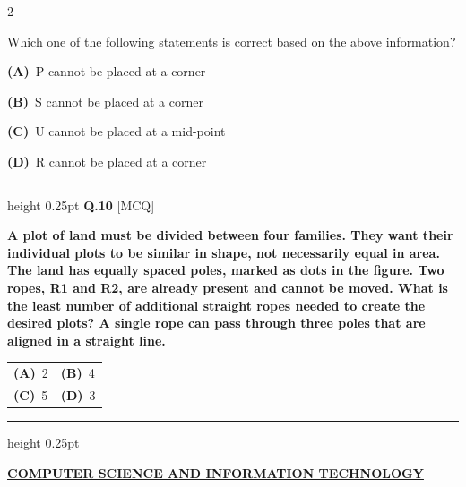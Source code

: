 \documentclass[a4paper,10pt,twoside]{article}
\begin{document}
\begin{multicols}{2}
{Which one of the following statements is correct based on the above information? \par}
\par\vspace{2pt}\noindent
\textbf{(A)}~P cannot be placed at a corner\par\vspace{2pt}\noindent
\textbf{(B)}~S cannot be placed at a corner\par\vspace{2pt}\noindent
\textbf{(C)}~U cannot be placed at a mid-point\par\vspace{2pt}\noindent
\textbf{(D)}~R cannot be placed at a corner
\par\vspace{6pt}\hrule height 0.25pt\vspace{6pt}
\noindent\textbf{Q.10} \hfill {\footnotesize\textsf{[MCQ]}}
\par\vspace{2pt}
{\bfseries A plot of land must be divided between four families. They want their individual plots to be similar in shape, not necessarily equal in area. The land has equally spaced poles, marked as dots in the figure. Two ropes, R1 and R2, are already present and cannot be moved.
What is the least number of additional straight ropes needed to create the desired plots? A single rope can pass through three poles that are aligned in a straight line. \par}
\par\vspace{2pt}\noindent
\begin{tabular*}{\columnwidth}{@{\extracolsep{\fill}}p{}p{}@{}}
\textbf{(A)}~2 & \textbf{(B)}~4 \\
\addlinespace[2pt]
\textbf{(C)}~5 & \textbf{(D)}~3
\end{tabular*}
\par\vspace{6pt}\hrule height 0.25pt\vspace{6pt}

\vspace{8pt}
\noindent\textbf{\large\underline{COMPUTER SCIENCE AND INFORMATION TECHNOLOGY}}\\[2pt]
\vspace{4pt}


\end{multicols}
\end{document}
